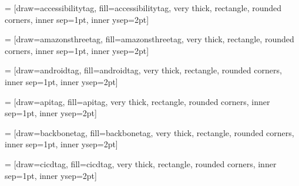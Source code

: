 \usepackage{tikz}
    
 = [draw=accessibilitytag, fill=accessibilitytag, very thick, rectangle, rounded corners, inner sep=1pt, inner ysep=2pt]
\newcommand{\accessibilitytag}{\begin{tikzpicture}\node [accessibilitytag] (box){{\scriptsize \color{white}{\textbf{\phantom{|}a11y\phantom{|}}}}};\end{tikzpicture}}
\usepackage{tikz}
    
 = [draw=amazonsthreetag, fill=amazonsthreetag, very thick, rectangle, rounded corners, inner sep=1pt, inner ysep=2pt]
\newcommand{\amazonsthreetag}{\begin{tikzpicture}\node [amazonsthreetag] (box){{\scriptsize \color{white}{\textbf{\phantom{|}Amazon S3\phantom{|}}}}};\end{tikzpicture}}
\usepackage{tikz}
    
 = [draw=androidtag, fill=androidtag, very thick, rectangle, rounded corners, inner sep=1pt, inner ysep=2pt]
\newcommand{\androidtag}{\begin{tikzpicture}\node [androidtag] (box){{\scriptsize \textbf{\phantom{|}Android\phantom{|}}}};\end{tikzpicture}}
\usepackage{tikz}
    
 = [draw=apitag, fill=apitag, very thick, rectangle, rounded corners, inner sep=1pt, inner ysep=2pt]
\newcommand{\apitag}{\begin{tikzpicture}\node [apitag] (box){{\scriptsize \textbf{\phantom{|}API\phantom{|}}}};\end{tikzpicture}}
\usepackage{tikz}
    
 = [draw=backbonetag, fill=backbonetag, very thick, rectangle, rounded corners, inner sep=1pt, inner ysep=2pt]
\newcommand{\backbonetag}{\begin{tikzpicture}\node [backbonetag] (box){{\scriptsize \color{white}{\textbf{\phantom{|}BackboneJS\phantom{|}}}}};\end{tikzpicture}}
\usepackage{tikz}
    
 = [draw=cicdtag, fill=cicdtag, very thick, rectangle, rounded corners, inner sep=1pt, inner ysep=2pt]
\newcommand{\cicdtag}{\begin{tikzpicture}\node [cicdtag] (box){{\scriptsize \textbf{\phantom{|}CI/CD\phantom{|}}}};\end{tikzpicture}}
\usepackage{tikz}
    
